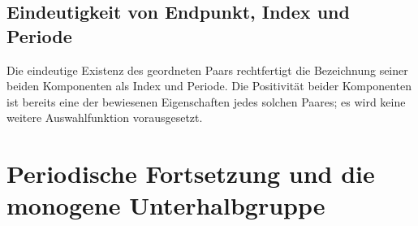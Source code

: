 \hypertarget{index-period.proof.FiniteSemigroupLeastRepetitionInitialDistinctness}{}


\hypertarget{index-period.proof.FiniteSemigroupLeastRepetitionProducesIndexPeriod}{}


\hypertarget{index-period.proof.FiniteSemigroupIndexPeriodExistence}{}


\subsection{Eindeutigkeit von Endpunkt, Index und Periode}
\hypertarget{index-period.proof.FiniteSemigroupIndexPeriodEndpointUnique}{}


\hypertarget{index-period.proof.FiniteSemigroupIndexPeriodIndexUnique}{}


\hypertarget{index-period.proof.FiniteSemigroupIndexPeriodUniqueness}{}


\hypertarget{index-period.proof.FiniteSemigroupIndexPeriod}{}

Die eindeutige Existenz des geordneten Paars rechtfertigt die Bezeichnung
seiner beiden Komponenten als Index und Periode. Die Positivität beider
Komponenten ist bereits eine der bewiesenen Eigenschaften jedes solchen
Paares; es wird keine weitere Auswahlfunktion vorausgesetzt.

\section{Periodische Fortsetzung und die monogene Unterhalbgruppe}
\hypertarget{index-period.proof.FiniteSemigroupPowerEqualityPropagation}{}


